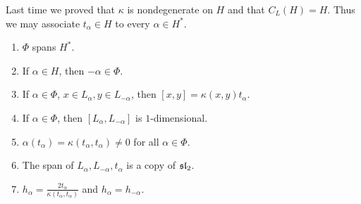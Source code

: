 \documentclass[twoside, 10pt]{article}
\begin{document}
    Last time we proved that $\kappa$ is nondegenerate on $H$ and that $C_L(H)
    = H$. Thus we may associate $t_{\alpha} \in H$ to every $\alpha \in H^*$.

    \begin{prop} \begin{enumerate} \item $\Phi$ spans $H^*$.  \item If $\alpha
        \in H$, then $-\alpha \in \Phi$.  \item If $\alpha \in \Phi$, $x \in
        L_{\alpha}, y \in L_{-\alpha}$, then $[x,y] = \kappa(x,y)t_{\alpha}$.
    \item If $\alpha \in \Phi$, then $[L_{\alpha}, L_{-\alpha}]$ is
        $1$-dimensional.  \item $\alpha(t_{\alpha}) = \kappa(t_{\alpha},
        t_{\alpha}) \neq 0$ for all $\alpha \in \Phi$.  \item The span of
        $L_{\alpha}, L_{-\alpha}, t_{\alpha}$ is a copy of $\mathfrak{sl}_2$.  \item
        $h_{\alpha} = \frac{2t_{\alpha}}{\kappa(t_{\alpha}, t_{\alpha})}$ and
        $h_{\alpha} = h_{-\alpha}$.  \end{enumerate} \end{prop}
\end{document}
